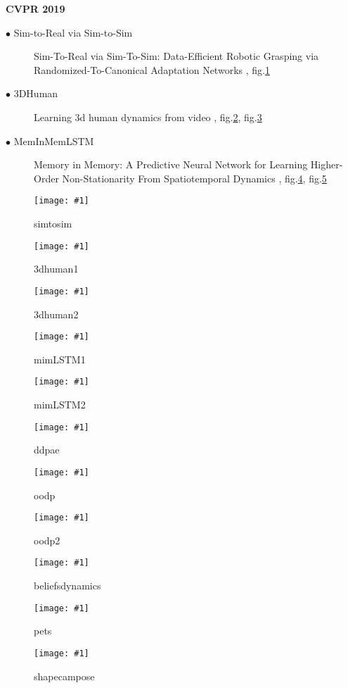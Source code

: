 \documentclass[12pt]{article}
\newcommand{\plotfigureS}[2]{
\begin{figure}[H]
\centering
\texttt{[image: \#1]}
\caption[#1]{#1}
\label{#1}
\end{figure}
}
\begin{document}
 
 {\LARGE\noindent\textbf{CVPR 2019}}


\begin{description}
  \item[$\bullet$ Sim-to-Real via Sim-to-Sim] Sim-To-Real via Sim-To-Sim: Data-Efficient Robotic Grasping via
Randomized-To-Canonical Adaptation Networks \cite{James_2019_CVPR},
fig.\ref{simtosim}
\item[$\bullet$ 3DHuman] Learning 3d human dynamics from video
  \cite{kanazawa_2019_cvpr}, fig.\ref{3dhuman1}, fig.\ref{3dhuman2}
\item[$\bullet$ MemInMemLSTM] Memory in Memory: A Predictive Neural Network for
  Learning Higher-Order Non-Stationarity From Spatiotemporal Dynamics \cite{Wang_2019_CVPR}, fig.\ref{mimLSTM1}, fig.\ref{mimLSTM2}



\end{description}



\plotfigureS{simtosim}{1.0}
\plotfigureS{3dhuman1}{1.0}
\plotfigureS{3dhuman2}{1.0}
\plotfigureS{mimLSTM1}{1.0}
\plotfigureS{mimLSTM2}{1.0}
\plotfigureS{ddpae}{1.0}
\plotfigureS{oodp}{1.0}
\plotfigureS{oodp2}{1.0}
\plotfigureS{beliefsdynamics}{1.0}
\plotfigureS{pets}{1.0}
\plotfigureS{shapecampose}{1.0}
\end{document}
